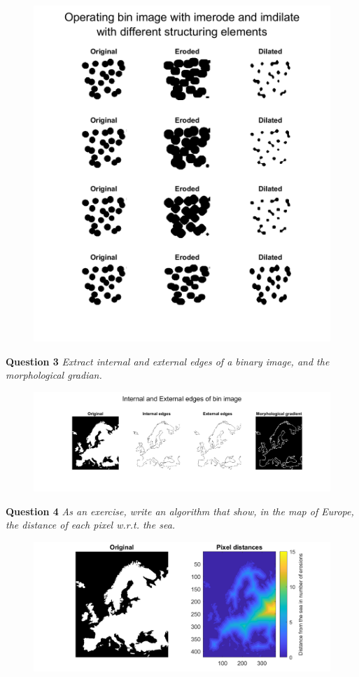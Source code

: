 \begin{figure}[H]
    \centering
    \includegraphics[width=0.75\linewidth]{Doc/Graphics/Part2/part2_Question2.png}
\end{figure}


\newpage
\textbf{Question 3} \textit{Extract internal and external edges of a binary image, and the morphological gradian.}
\begin{figure}[h]
    \centering
    \includegraphics[width=1\linewidth]{Doc/Graphics/Part2/Part2_Question3.png}
\end{figure}


\textbf{Question 4} \textit{As an exercise, write an algorithm that show, in the map of Europe, the distance of each pixel w.r.t. the sea.}
\begin{figure}[h]
    \centering
    \includegraphics[width=0.75\linewidth]{Doc/Graphics/Part2/part2_Question4.png}
\end{figure}




